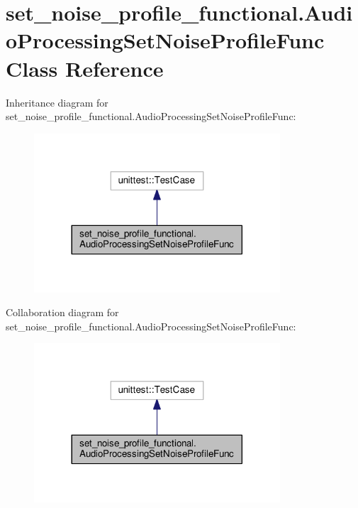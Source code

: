 \hypertarget{classset__noise__profile__functional_1_1AudioProcessingSetNoiseProfileFunc}{\section{set\-\_\-noise\-\_\-profile\-\_\-functional.\-Audio\-Processing\-Set\-Noise\-Profile\-Func Class Reference}
\label{classset__noise__profile__functional_1_1AudioProcessingSetNoiseProfileFunc}
}


Inheritance diagram for set\-\_\-noise\-\_\-profile\-\_\-functional.\-Audio\-Processing\-Set\-Noise\-Profile\-Func\-:
\nopagebreak
\begin{figure}[H]
\begin{center}
\leavevmode
\includegraphics[width=260pt]{classset__noise__profile__functional_1_1AudioProcessingSetNoiseProfileFunc__inherit__graph}
\end{center}
\end{figure}


Collaboration diagram for set\-\_\-noise\-\_\-profile\-\_\-functional.\-Audio\-Processing\-Set\-Noise\-Profile\-Func\-:
\nopagebreak
\begin{figure}[H]
\begin{center}
\leavevmode
\includegraphics[width=260pt]{classset__noise__profile__functional_1_1AudioProcessingSetNoiseProfileFunc__coll__graph}
\end{center}
\end{figure}
